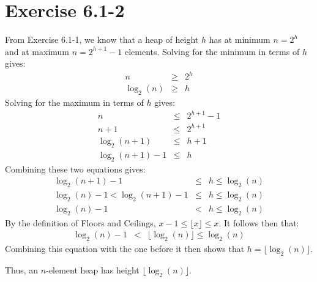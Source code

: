 \documentclass{article}
\begin{document}
\section*{Exercise 6.1-2}

From Exercise 6.1-1, we know that a heap of height $h$ has at minimum $n = 2^h$ and at maximum $n = 2^{h+1} - 1$ elements. Solving for the minimum in terms of $h$ gives:
\begin{eqnarray*}
	n & \geq & 2^h \\
	\log_2(n) & \geq & h
\end{eqnarray*}
Solving for the maximum in terms of $h$ gives:
\begin{eqnarray*}
	n & \leq & 2^{h+1} - 1 \\
	n + 1 & \leq & 2^{h+1} \\
	\log_2(n+1) & \leq & h + 1 \\
	\log_2(n+1) - 1 & \leq & h
\end{eqnarray*}
Combining these two equations gives:
\begin{eqnarray*}
	\log_2(n+1) - 1& \leq & h \leq \log_2(n) \\
	\log_2(n) - 1 < \log_2(n+1) - 1 & \leq & h \leq \log_2(n) \\
	\log_2(n) - 1 & < & h \leq \log_2(n)
\end{eqnarray*}
By the definition of Floors and Ceilings, $x - 1 \leq \lfloor x \rfloor \leq x$. It follows then that:
\begin{eqnarray*}
	\log_2(n) - 1 & < & \lfloor \log_2(n) \rfloor \leq \log_2(n)
\end{eqnarray*}
Combining this equation with the one before it then shows that $h = \lfloor \log_2(n) \rfloor$.

Thus, an $n$-element heap has height $\lfloor \log_2(n) \rfloor$.
\end{document}
